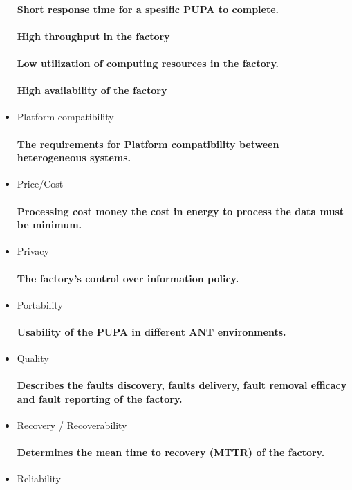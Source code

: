 \documentclass{acm_proc_article-sp}
\begin{document}
\begin{itemize}
\paragraph{Short response time for a spesific PUPA to complete.}
\paragraph{High throughput in the factory}
\paragraph{Low utilization of computing resources in the factory.}
\paragraph{High availability of the factory}
\item Platform compatibility
\paragraph{The requirements for Platform compatibility between heterogeneous systems.}
\item Price/Cost
\paragraph{Processing cost money the cost in energy to process the data must be minimum.}
\item Privacy
\paragraph{The factory's control over information policy.}
\item Portability
\paragraph{Usability of the PUPA in different ANT environments.}
\item Quality 
\paragraph{Describes the faults discovery, faults delivery, fault removal efficacy and fault reporting of the factory.}
\item Recovery / Recoverability
\paragraph{Determines the mean time to recovery (MTTR) of the factory.}
\item Reliability

\end{itemize}
\end{document}
